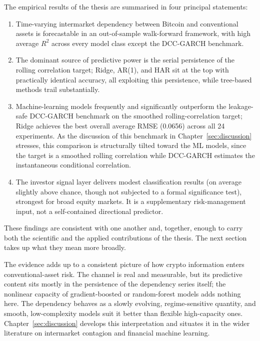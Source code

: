 The empirical results of the thesis are summarised in four principal statements:

\begin{enumerate}
    \item Time-varying intermarket dependency between Bitcoin and conventional assets is forecastable in an out-of-sample walk-forward framework, with high average $R^2$ across every model class except the DCC-GARCH benchmark.
    \item The dominant source of predictive power is the serial persistence of the rolling correlation target; Ridge, AR(1), and HAR sit at the top with practically identical accuracy, all exploiting this persistence, while tree-based methods trail substantially.
    \item Machine-learning models frequently and significantly outperform the leakage-safe DCC-GARCH benchmark on the smoothed rolling-correlation target; Ridge achieves the best overall average RMSE (0.0656) across all 24 experiments. As the discussion of this benchmark in Chapter~\ref{sec:discussion} stresses, this comparison is structurally tilted toward the ML models, since the target is a smoothed rolling correlation while DCC-GARCH estimates the instantaneous conditional correlation.
    \item The investor signal layer delivers modest classification results (on average slightly above chance, though not subjected to a formal significance test), strongest for broad equity markets. It is a supplementary risk-management input, not a self-contained directional predictor.
\end{enumerate}

These findings are consistent with one another and, together, enough to carry both the scientific and the applied contributions of the thesis. The next section takes up what they mean more broadly.

The evidence adds up to a consistent picture of how crypto information enters conventional-asset risk. The channel is real and measurable, but its predictive content sits mostly in the persistence of the dependency series itself; the nonlinear capacity of gradient-boosted or random-forest models adds nothing here. The dependency behaves as a slowly evolving, regime-sensitive quantity, and smooth, low-complexity models suit it better than flexible high-capacity ones. Chapter~\ref{sec:discussion} develops this interpretation and situates it in the wider literature on intermarket contagion and financial machine learning.

